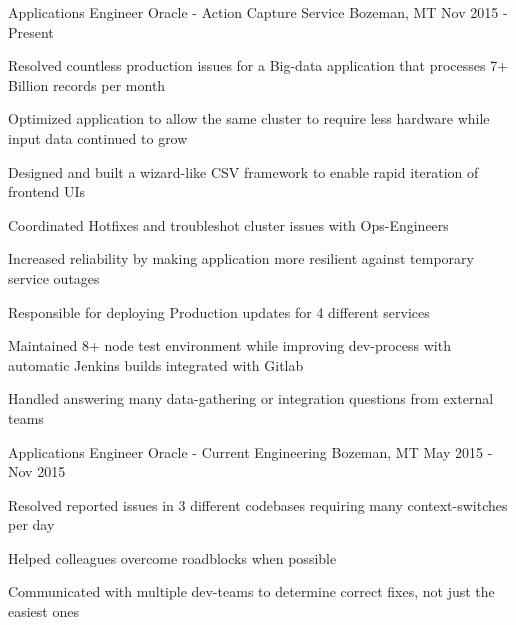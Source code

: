 

\begin{cventries}

  \cventry
    {Applications Engineer} %
    {Oracle - Action Capture Service} %
    {Bozeman, MT} %
    {Nov 2015 - Present} %
    {
      \begin{cvitems} %
        \item {Resolved countless production issues for a Big-data application that processes 7+ Billion records per month}
        \item {Optimized application to allow the same cluster to require less hardware while input data continued to grow}
        \item {Designed and built a wizard-like CSV framework to enable rapid iteration of frontend UIs}
        \item {Coordinated Hotfixes and troubleshot cluster issues with Ops-Engineers}
        \item {Increased reliability by making application more resilient against temporary service outages}
        \item {Responsible for deploying Production updates for 4 different services}
        \item {Maintained 8+ node test environment while improving dev-process with automatic Jenkins builds integrated with Gitlab}
        \item {Handled answering many data-gathering or integration questions from external teams}
      \end{cvitems}
    }

  \cventry
    {Applications Engineer} %
    {Oracle - Current Engineering} %
    {Bozeman, MT} %
    {May 2015 - Nov 2015} %
    {
      \begin{cvitems} %
        \item {Resolved reported issues in 3 different codebases requiring many context-switches per day}
        \item {Helped colleagues overcome roadblocks when possible}
        \item {Communicated with multiple dev-teams to determine correct fixes, not just the easiest ones}
      \end{cvitems}
    }


\end{cventries}
